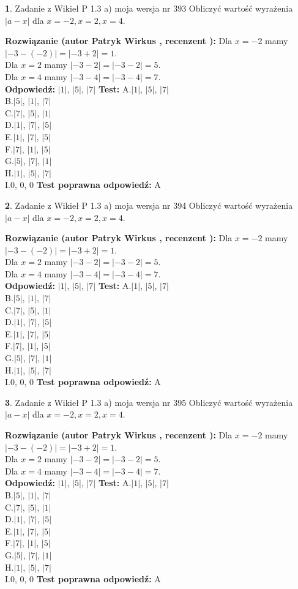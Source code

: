 \documentclass[12pt, a4paper]{article}
\theoremstyle{definition} %
\newtheorem{zad}{}
\newcommand{\zadStart}[1]{\begin{zad}#1\newline}
\newcommand{\zadStop}{\end{zad}}
\newcommand{\rozwStart}[2]{\noindent \textbf{Rozwiązanie (autor #1 , recenzent #2): }\newline}
\newcommand{\rozwStop}{\newline}
\newcommand{\odpStart}{\noindent \textbf{Odpowiedź:}\newline}
\newcommand{\odpStop}{\newline}
\newcommand{\testStart}{\noindent \textbf{Test:}\newline}
\newcommand{\testStop}{\newline}
\newcommand{\kluczStart}{\noindent \textbf{Test poprawna odpowiedź:}\newline}
\newcommand{\kluczStop}{\newline}
\begin{document}
\zadStart{Zadanie z Wikieł P 1.3 a) moja wersja nr 393}
Obliczyć wartość wyrażenia $|a - x|$ dla $x=-2,x=2,x=4$.
\zadStop
\rozwStart{Patryk Wirkus}{}
Dla $x = -2$ mamy $|-3 - (-2)| = |-3 + 2| = 1$.\\
Dla $x = 2$ mamy $|-3 - 2| = |-3 - 2| = 5$.\\
Dla $x = 4$ mamy $|-3 - 4| = |-3 - 4| = 7$.\\
\rozwStop
\odpStart
$|1|$, $|5|$, $|7|$
\odpStop
\testStart
A.$|1|$, $|5|$, $|7|$\\
B.$|5|$, $|1|$, $|7|$\\
C.$|7|$, $|5|$, $|1|$\\
D.$|1|$, $|7|$, $|5|$\\
E.$|1|$, $|7|$, $|5|$\\
F.$|7|$, $|1|$, $|5|$\\
G.$|5|$, $|7|$, $|1|$\\
H.$|1|$, $|5|$, $|7|$\\
I.$0$, $0$, $0$
\testStop
\kluczStart
A
\kluczStop



\zadStart{Zadanie z Wikieł P 1.3 a) moja wersja nr 394}
Obliczyć wartość wyrażenia $|a - x|$ dla $x=-2,x=2,x=4$.
\zadStop
\rozwStart{Patryk Wirkus}{}
Dla $x = -2$ mamy $|-3 - (-2)| = |-3 + 2| = 1$.\\
Dla $x = 2$ mamy $|-3 - 2| = |-3 - 2| = 5$.\\
Dla $x = 4$ mamy $|-3 - 4| = |-3 - 4| = 7$.\\
\rozwStop
\odpStart
$|1|$, $|5|$, $|7|$
\odpStop
\testStart
A.$|1|$, $|5|$, $|7|$\\
B.$|5|$, $|1|$, $|7|$\\
C.$|7|$, $|5|$, $|1|$\\
D.$|1|$, $|7|$, $|5|$\\
E.$|1|$, $|7|$, $|5|$\\
F.$|7|$, $|1|$, $|5|$\\
G.$|5|$, $|7|$, $|1|$\\
H.$|1|$, $|5|$, $|7|$\\
I.$0$, $0$, $0$
\testStop
\kluczStart
A
\kluczStop



\zadStart{Zadanie z Wikieł P 1.3 a) moja wersja nr 395}
Obliczyć wartość wyrażenia $|a - x|$ dla $x=-2,x=2,x=4$.
\zadStop
\rozwStart{Patryk Wirkus}{}
Dla $x = -2$ mamy $|-3 - (-2)| = |-3 + 2| = 1$.\\
Dla $x = 2$ mamy $|-3 - 2| = |-3 - 2| = 5$.\\
Dla $x = 4$ mamy $|-3 - 4| = |-3 - 4| = 7$.\\
\rozwStop
\odpStart
$|1|$, $|5|$, $|7|$
\odpStop
\testStart
A.$|1|$, $|5|$, $|7|$\\
B.$|5|$, $|1|$, $|7|$\\
C.$|7|$, $|5|$, $|1|$\\
D.$|1|$, $|7|$, $|5|$\\
E.$|1|$, $|7|$, $|5|$\\
F.$|7|$, $|1|$, $|5|$\\
G.$|5|$, $|7|$, $|1|$\\
H.$|1|$, $|5|$, $|7|$\\
I.$0$, $0$, $0$
\testStop
\kluczStart
A
\kluczStop
\end{document}

